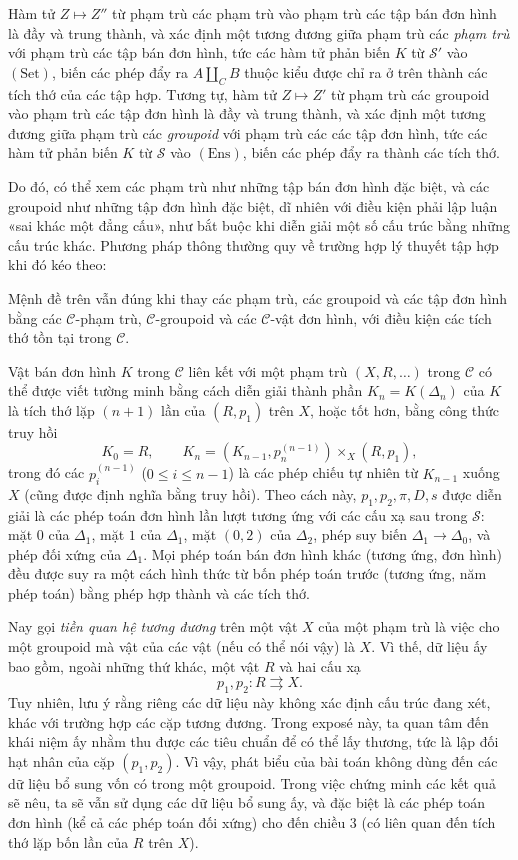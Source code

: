  Hàm tử $Z\longmapsto Z''$ từ phạm trù các phạm trù vào
phạm trù các tập bán đơn hình là đầy và trung thành, và xác định một tương
đương giữa phạm trù các \emph{phạm trù} với phạm trù các tập bán đơn hình,
tức các hàm tử phản biến $K$ từ $\mathcal S'$ vào $(\mathrm{Set})$, biến các
phép đẩy ra $A\amalg_C B$ thuộc kiểu được chỉ ra ở trên thành các tích thớ của
các tập hợp. Tương tự, hàm tử $Z\longmapsto Z'$ từ phạm trù các groupoid vào
phạm trù các tập đơn hình là đầy và trung thành, và xác định một tương
đương giữa phạm trù các \emph{groupoid} với phạm trù các
các tập đơn hình, tức các hàm tử phản biến $K$ từ $\mathcal S$ vào
$(\mathrm{Ens})$, biến các phép đẩy ra thành các tích thớ.

Do đó, có thể xem các phạm trù như những tập bán đơn hình đặc biệt, và các
groupoid như những tập đơn hình đặc biệt, dĩ nhiên với điều kiện phải lập luận
«sai khác một đẳng cấu», như bắt buộc khi diễn giải một số cấu trúc bằng những
cấu trúc khác. Phương pháp thông thường quy về trường hợp lý thuyết tập hợp
khi đó kéo theo:

 Mệnh đề trên vẫn đúng khi thay các phạm trù, các
groupoid và các tập đơn hình bằng các $\mathcal C$-phạm trù,
$\mathcal C$-groupoid và các $\mathcal C$-vật đơn hình, với điều kiện các tích
thớ tồn tại trong $\mathcal C$.

Vật bán đơn hình $K$ trong $\mathcal C$ liên kết với một phạm trù
$(X,R,\ldots)$ trong $\mathcal C$ có thể được viết tường minh bằng cách diễn
giải thành phần $K_n=K(\Delta_n)$ của $K$ là tích thớ lặp $(n+1)$ lần của
$(R,p_1)$ trên $X$, hoặc tốt hơn, bằng công thức truy hồi
\[
  K_0=R,\qquad
  K_n=(K_{n-1},p_n^{(n-1)})\times_X(R,p_1),
\]
trong đó các $p_i^{(n-1)}$ ($0\leq i\leq n-1$) là các phép chiếu tự nhiên từ
$K_{n-1}$ xuống $X$ (cũng được định nghĩa bằng truy hồi). Theo cách này,
$p_1,p_2,\pi,D,s$ được diễn giải là các phép toán đơn hình lần lượt tương ứng
với các cấu xạ sau trong $\mathcal S$: mặt $0$ của $\Delta_1$, mặt $1$ của
$\Delta_1$, mặt $(0,2)$ của $\Delta_2$, phép suy biến
$\Delta_1\to\Delta_0$, và phép đối xứng của $\Delta_1$. Mọi phép toán bán đơn
hình khác (tương ứng, đơn hình) đều được suy ra một cách hình thức từ bốn
phép toán trước (tương ứng, năm phép toán) bằng phép hợp thành và các tích thớ.

Nay gọi \emph{tiền quan hệ tương đương} trên một vật $X$ của một phạm trù là
việc cho một groupoid mà vật của các vật (nếu có thể nói vậy) là $X$. Vì thế,
dữ liệu ấy bao gồm, ngoài những thứ khác, một vật $R$ và hai cấu xạ
\[
  p_1,p_2:R\rightrightarrows X.
\]
Tuy nhiên, lưu ý rằng riêng các dữ liệu này không xác định cấu trúc đang xét,
khác với trường hợp các cặp tương đương. Trong exposé này, ta quan tâm đến
khái niệm ấy nhằm thu được các tiêu chuẩn để có thể lấy thương, tức là lập đối
hạt nhân của cặp $(p_1,p_2)$. Vì vậy, phát biểu của bài toán không dùng đến
các dữ liệu bổ sung vốn có trong một groupoid. Trong việc chứng minh các kết
quả sẽ nêu, ta sẽ
vẫn sử dụng các dữ liệu bổ sung ấy, và đặc biệt là các phép toán đơn hình
(kể cả các phép toán đối xứng) cho đến chiều $3$ (có liên quan đến tích thớ
lặp bốn lần của $R$ trên $X$).

